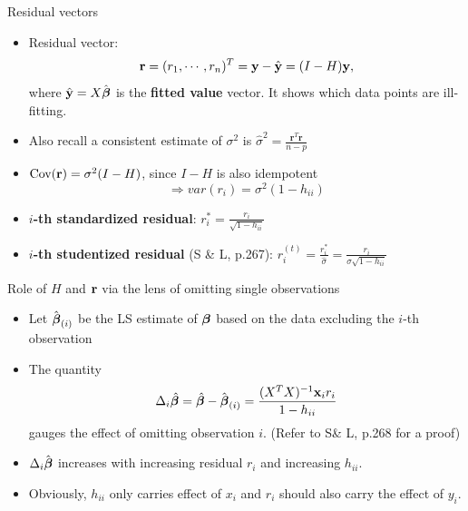 \documentclass{beamer}
\newenvironment{wideitemize}%
  {\begin{itemize}%
    \setlength{\parskip}{1em}}%
  {\end{itemize}}
\begin{document}
\begin{frame}{Residual vectors}
\begin{wideitemize}
\item
Residual vector:
\[\textbf{r}= (r_1,\cdots, r_n)^T = \textbf{y}-\hat{\textbf{y}} = (I - H){\bf y},\] where $\hat{\textbf{y}}=X\hat{\mbox{\boldmath $\beta$}}$
is the \textbf{fitted value} vector. It shows which data points are ill-fitting.

\item Also recall a consistent estimate of $\sigma^2$ is $ \hat{\sigma}^2=\frac{\textbf{r}^T
\textbf{r}}{n-p}$

\item$\text{Cov}({\bf r}) = \sigma^2 (I  - H)$,  since $I- H$ is also idempotent 
\[
 \Rightarrow var(r_i) = \sigma^2 (1 - h_{ii})
 \]

\item
\textbf{$i$-th standardized residual}: 
$\displaystyle r_i^*=\frac{r_i}{\sqrt{1-h_{ii}}}$ 
\item  \textbf{$i$-th studentized residual} (S \& L, p.267): $r_i^{(t)}=\frac{r_i^*}{\hat{\sigma}}=\frac{r_i}{\hat{\sigma}\sqrt{1-h_{ii}}}$
 
\end{wideitemize}
\end{frame}

\begin{frame}{Role of $H$ and ${\bf r}$ via the lens of omitting single observations}
\begin{wideitemize}

\item Let $\hat{\mbox{\boldmath $\beta$}}_{(i)}$ be the  LS estimate of $\mbox{\boldmath $\beta$}$ based on 
the data excluding the $i$-th observation

\item The quantity
\[
\Delta_i\hat{\boldsymbol \beta}=\hat{\boldsymbol \beta}-\hat{\mbox{\boldmath $\beta$}}_{(i)}
=\frac{(X^TX)^{-1}\textbf{x}_ir_i}{1-h_{ii}}
\]
gauges the effect of omitting observation $i$.  (Refer to S\& L, p.268 for a proof)

\item
$\Delta_i\hat{\mbox{\boldmath $\beta$}}$ increases with increasing residual $r_i$ and increasing $h_{ii}$. 

\item Obviously, $h_{ii}$ only carries effect of $x_i$ and $r_i$ should also carry the effect of $y_i$.

\end{wideitemize}

\end{frame}
%
%
\end{document}

